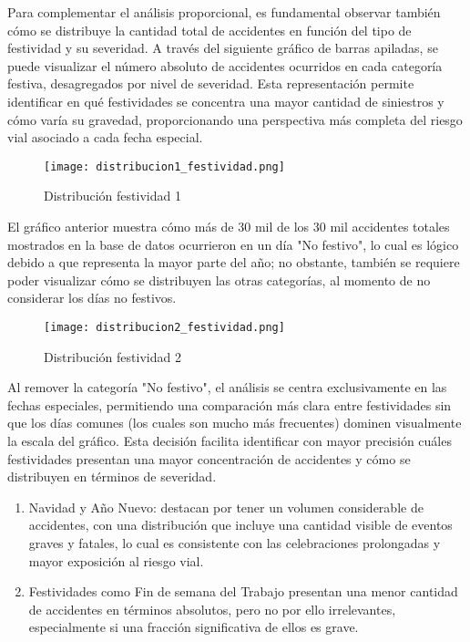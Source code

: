 \documentclass{book}
\begin{document}
Para complementar el análisis proporcional, es fundamental observar también cómo se distribuye la cantidad total de accidentes en función del tipo de festividad y su severidad. A través del siguiente gráfico de barras apiladas, se puede visualizar el número absoluto de accidentes ocurridos en cada categoría festiva, desagregados por nivel de severidad. Esta representación permite identificar en qué festividades se concentra una mayor cantidad de siniestros y cómo varía su gravedad, proporcionando una perspectiva más completa del riesgo vial asociado a cada fecha especial.

\begin{figure}[htbp]
\centering
\texttt{[image: distribucion1\_festividad.png]}
\caption{\label{fig:distribucion festividad 1}Distribución festividad 1}
\end{figure}

El gráfico anterior muestra cómo más de 30 mil de los 30 mil accidentes totales mostrados en la base de datos ocurrieron en un día "No festivo", lo cual es lógico debido a que representa la mayor parte del año; no obstante, también se requiere poder visualizar cómo se distribuyen las otras categorías, al momento de no considerar los días no festivos.

\begin{figure}[htbp]
\centering
\texttt{[image: distribucion2\_festividad.png]}
\caption{\label{fig:distribucion festividad 2}Distribución festividad 2}
\end{figure}

Al remover la categoría "No festivo", el análisis se centra exclusivamente en las fechas especiales, permitiendo una comparación más clara entre festividades sin que los días comunes (los cuales son mucho más frecuentes) dominen visualmente la escala del gráfico. Esta decisión facilita identificar con mayor precisión cuáles festividades presentan una mayor concentración de accidentes y cómo se distribuyen en términos de severidad.

\begin{enumerate}

\item Navidad y Año Nuevo: destacan por tener un volumen considerable de accidentes, con una distribución que incluye una cantidad visible de eventos graves y fatales, lo cual es consistente con las celebraciones prolongadas y mayor exposición al riesgo vial.

\item Festividades como Fin de semana del Trabajo presentan una menor cantidad de accidentes en términos absolutos, pero no por ello irrelevantes, especialmente si una fracción significativa de ellos es grave.

\end{enumerate}
\end{document}
